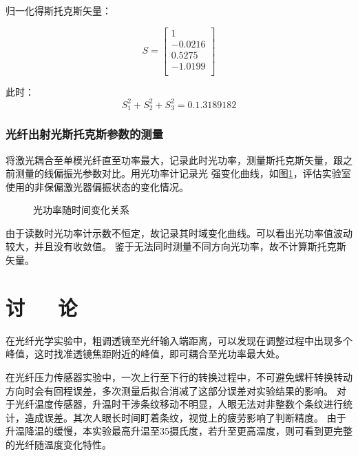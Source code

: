 \documentclass[10pt,a4paper,twoside,UTF8]{ctexart}
\begin{document}
归一化得斯托克斯矢量：

\begin{equation}
	S=
	\left[ 
		\begin{array}{c}
		1\\
		-0.0216\\
		0.5275\\
		-1.0199\\
		\end{array} 
	\right ]
\end{equation}

此时：
\begin{equation*}
	S_1^2+S_2^2+S_3^2=0.1.3189182
\end{equation*}

\subsubsection{光纤出射光斯托克斯参数的测量}
将激光耦合至单模光纤直至功率最大，记录此时光功率，测量斯托克斯矢量，跟之前测量的线偏振光参数对比。用光功率计记录光
强变化曲线，如图\ref{fig:Power}，评估实验室使用的非保偏激光器偏振状态的变化情况。


\begin{figure}[H]
	\centering

	\caption{光功率随时间变化关系}
	\label{fig:Power}
\end{figure}

由于读数时光功率计示数不恒定，故记录其时域变化曲线。可以看出光功率值波动较大，并且没有收敛值。
鉴于无法同时测量不同方向光功率，故不计算斯托克斯矢量。

\section{讨~~~论}
在光纤光学实验中，粗调透镜至光纤输入端距离，可以发现在调整过程中出现多个峰值，这时找准透镜焦距附近的峰值，即可耦合至光功率最大处。

在光纤压力传感器实验中，一次上行至下行的转换过程中，不可避免螺杆转换转动方向时会有回程误差，多次测量后拟合消减了这部分误差对实验结果的影响。
对于光纤温度传感器，升温时干涉条纹移动不明显，人眼无法对非整数个条纹进行统计，造成误差。其次人眼长时间盯着条纹，视觉上的疲劳影响了判断精度。
由于升温降温的缓慢，本实验最高升温至35摄氏度，若升至更高温度，则可看到更完整的光纤随温度变化特性。
\end{document}
